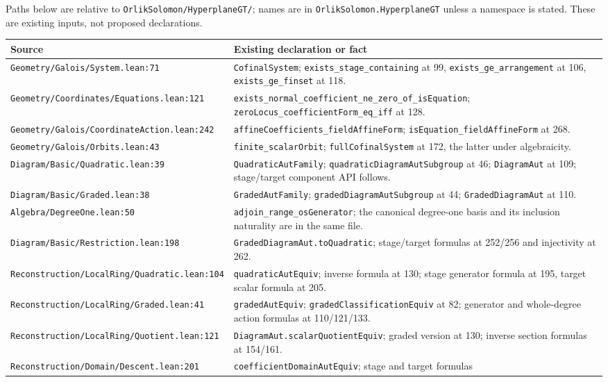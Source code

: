 \documentclass[11pt]{article}
\theoremstyle{remark}\newtheorem{remark}[theorem]{Remark}
\newcommand{\code}[1]{{\normalfont\nolinkurl{#1}}}
\begin{document}
Paths below are relative to \code{OrlikSolomon/HyperplaneGT/}; names
are in \code{OrlikSolomon.HyperplaneGT} unless a namespace is stated.
These are existing inputs, not proposed declarations.
\small
\begin{longtable}{@{}p{}p{}@{}}
\toprule Source & Existing declaration or fact\\\midrule\endhead
\code{Geometry/Galois/System.lean:71}&
\code{CofinalSystem}; \code{exists_stage_containing} at 99,
\code{exists_ge_arrangement} at 106, \code{exists_ge_finset} at 118.\\
\code{Geometry/Coordinates/Equations.lean:121}&
\code{exists_normal_coefficient_ne_zero_of_isEquation};
\code{zeroLocus_coefficientForm_eq_iff} at 128.\\
\code{Geometry/Galois/CoordinateAction.lean:242}&
\code{affineCoefficients_fieldAffineForm};
\code{isEquation_fieldAffineForm} at 268.\\
\code{Geometry/Galois/Orbits.lean:43}&
\code{finite_scalarOrbit}; \code{fullCofinalSystem} at 172,
the latter under algebraicity.\\
\code{Diagram/Basic/Quadratic.lean:39}&
\code{QuadraticAutFamily}; \code{quadraticDiagramAutSubgroup} at 46;
\code{DiagramAut} at 109; stage/target component API follows.\\
\code{Diagram/Basic/Graded.lean:38}&
\code{GradedAutFamily}; \code{gradedDiagramAutSubgroup} at 44;
\code{GradedDiagramAut} at 110.\\
\code{Algebra/DegreeOne.lean:50}&
\code{adjoin_range_osGenerator}; the canonical degree-one basis
and its inclusion naturality are in the same file.\\
\code{Diagram/Basic/Restriction.lean:198}&
\code{GradedDiagramAut.toQuadratic}; stage/target formulas at
252/256 and injectivity at 262.\\
\code{Reconstruction/LocalRing/Quadratic.lean:104}&
\code{quadraticAutEquiv}; inverse formula at 130;
stage generator formula at 195, target scalar formula at 205.\\
\code{Reconstruction/LocalRing/Graded.lean:41}&
\code{gradedAutEquiv}; \code{gradedClassificationEquiv} at 82;
generator and whole-degree action formulas at 110/121/133.\\
\code{Reconstruction/LocalRing/Quotient.lean:121}&
\code{DiagramAut.scalarQuotientEquiv}; graded version at 130;
inverse section formulas at 154/161.\\
\code{Reconstruction/Domain/Descent.lean:201}&
\code{coefficientDomainAutEquiv}; stage and target formulas

\end{longtable}
\end{document}
